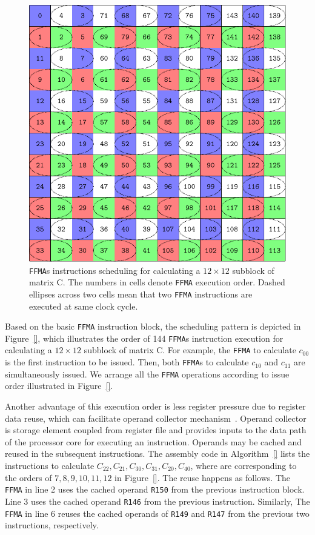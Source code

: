 \documentclass{sig-alternate-05-2015}
\begin{document}
\begin{figure}[htbp]
\begin{center}
\includegraphics[scale=0.5]{order}
\caption{{\tt FFMA}s instructions scheduling for calculating a $12\times 12$ subblock of matrix C.  The numbers in cells denote {\tt FFMA} execution order. Dashed ellipses across two cells mean that two {\tt FFMA} instructions are executed at same clock cycle.}
\label{fig:order}
\end{center}
\end{figure}

Based on the basic {\tt FFMA} instruction block, the scheduling pattern is depicted in Figure~\ref{}, which illustrates the order of 144 {\tt FFMA}s instruction execution for calculating a $12\times 12$ subblock of matrix C. For example, the {\tt FFMA} to calculate $c_{00}$ is the first instruction to be issued. Then, both {\tt FFMA}s to calculate $c_{10}$ and  $c_{11}$ are simultaneously issued. We arrange all the {\tt FFMA} operations according to issue order illustrated in Figure~\ref{}.

Another advantage of this execution order is less register pressure due to register data reuse, which can facilitate operand collector mechanism~\cite{collector}. Operand collector is storage element coupled from register file and provides inputs to the data path of the processor core for executing an instruction. Operands may be cached and reused in the subsequent instructions. The assembly code in Algorithm~\ref{} lists the instructions to calculate $C_{22}, C_{21}, C_{30}, C_{31}, C_{20}, C_{40}$, where are corresponding to the orders of $7,8,9,10,11,12$ in Figure~\ref{}. The reuse happens as follows. The {\tt FFMA} in line 2 uses the cached operand {\tt R150} from the previous instruction block. Line 3 uses the cached operand {\tt R146} from the previous instruction. Similarly, The {\tt FFMA} in line 6 reuses the cached operands of   {\tt R149} and {\tt R147} from the previous two instructions, respectively.
\end{document}
